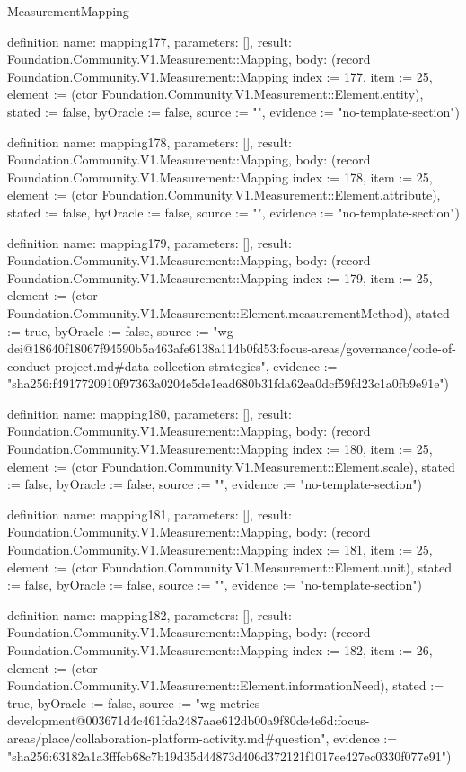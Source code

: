 \begin{lexlean}{MeasurementMapping}
\begin{semanticmodule}
definition{
  name: mapping177,
  parameters: [],
  result: Foundation.Community.V1.Measurement::Mapping,
  body: (record Foundation.Community.V1.Measurement::Mapping {index := 177, item := 25, element := (ctor Foundation.Community.V1.Measurement::Element.entity), stated := false, byOracle := false, source := "", evidence := "no-template-section"})
}

definition{
  name: mapping178,
  parameters: [],
  result: Foundation.Community.V1.Measurement::Mapping,
  body: (record Foundation.Community.V1.Measurement::Mapping {index := 178, item := 25, element := (ctor Foundation.Community.V1.Measurement::Element.attribute), stated := false, byOracle := false, source := "", evidence := "no-template-section"})
}

definition{
  name: mapping179,
  parameters: [],
  result: Foundation.Community.V1.Measurement::Mapping,
  body: (record Foundation.Community.V1.Measurement::Mapping {index := 179, item := 25, element := (ctor Foundation.Community.V1.Measurement::Element.measurementMethod), stated := true, byOracle := false, source := "wg-dei@18640f18067f94590b5a463afe6138a114b0fd53:focus-areas/governance/code-of-conduct-project.md#data-collection-strategies", evidence := "sha256:f4917720910f97363a0204e5de1ead680b31fda62ea0dcf59fd23c1a0fb9e91e"})
}

definition{
  name: mapping180,
  parameters: [],
  result: Foundation.Community.V1.Measurement::Mapping,
  body: (record Foundation.Community.V1.Measurement::Mapping {index := 180, item := 25, element := (ctor Foundation.Community.V1.Measurement::Element.scale), stated := false, byOracle := false, source := "", evidence := "no-template-section"})
}

definition{
  name: mapping181,
  parameters: [],
  result: Foundation.Community.V1.Measurement::Mapping,
  body: (record Foundation.Community.V1.Measurement::Mapping {index := 181, item := 25, element := (ctor Foundation.Community.V1.Measurement::Element.unit), stated := false, byOracle := false, source := "", evidence := "no-template-section"})
}

definition{
  name: mapping182,
  parameters: [],
  result: Foundation.Community.V1.Measurement::Mapping,
  body: (record Foundation.Community.V1.Measurement::Mapping {index := 182, item := 26, element := (ctor Foundation.Community.V1.Measurement::Element.informationNeed), stated := true, byOracle := false, source := "wg-metrics-development@003671d4c461fda2487aae612db00a9f80de4e6d:focus-areas/place/collaboration-platform-activity.md#question", evidence := "sha256:63182a1a3fffcb68c7b19d35d44873d406d372121f1017ee427ec0330f077e91"})
}


\end{semanticmodule}
\end{lexlean}
